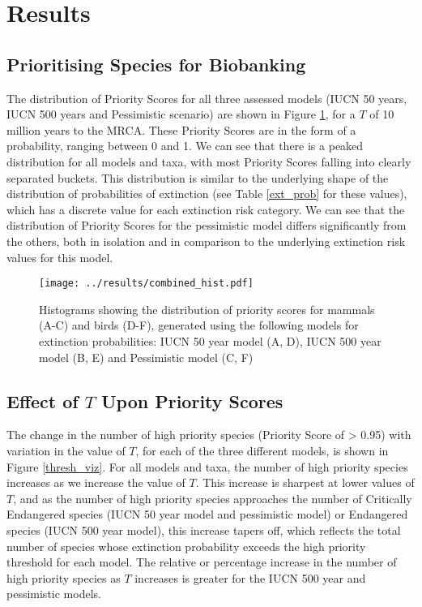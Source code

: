 \documentclass[10pt]{article}
\begin{document}
	
	\section{Results}
	\subsection{Prioritising Species for Biobanking}
	The distribution of Priority Scores for all three assessed models (IUCN 50 years,
	IUCN 500 years and Pessimistic scenario) are shown in Figure \ref{ps_hist}, for
	a $T$ of 10 million years to the MRCA. These Priority Scores are in the form
	of a probability, ranging between 0 and 1. We can see that there is a peaked
	distribution for all models and taxa, with most Priority Scores falling into
	clearly separated buckets. This distribution is similar to the underlying
	shape of the distribution of probabilities of extinction (see Table \ref{ext_prob}
	for these values), which has a discrete value for each extinction risk
	category. We can see that the distribution of Priority Scores for the
	pessimistic model differs significantly from the others, both in isolation
	and in comparison to the underlying extinction risk values for this model.
	
	\begin{figure}
		\texttt{[image: ../results/combined\_hist.pdf]}
		\caption{Histograms showing the distribution of priority scores for
		mammals (A-C) and birds (D-F), generated using the following models for
		extinction probabilities: IUCN 50 year model (A, D), IUCN 500 year
		model (B, E) and Pessimistic model (C, F)}\label{ps_hist}
	\end{figure}

	\subsection{Effect of $T$ Upon Priority Scores}
	The change in the number of high priority species (Priority Score of > 0.95)
	with variation in the value of $T$, for each of the three different models, is
	shown in Figure \ref{thresh_viz}. For all models and taxa, the number of high
	priority species increases as we increase the value of $T$. This increase
	is sharpest at lower values of $T$, and as the number of high priority
	species approaches the number of Critically Endangered species (IUCN 
	50 year model and pessimistic model) or Endangered species (IUCN 500 year
	model), this increase tapers off, which reflects the total number of species
	whose extinction probability exceeds the high priority threshold for
	each model. The relative or percentage increase in the number of high
	priority species as $T$ increases
	is greater for the IUCN 500 year and pessimistic models.
	
\end{document}
